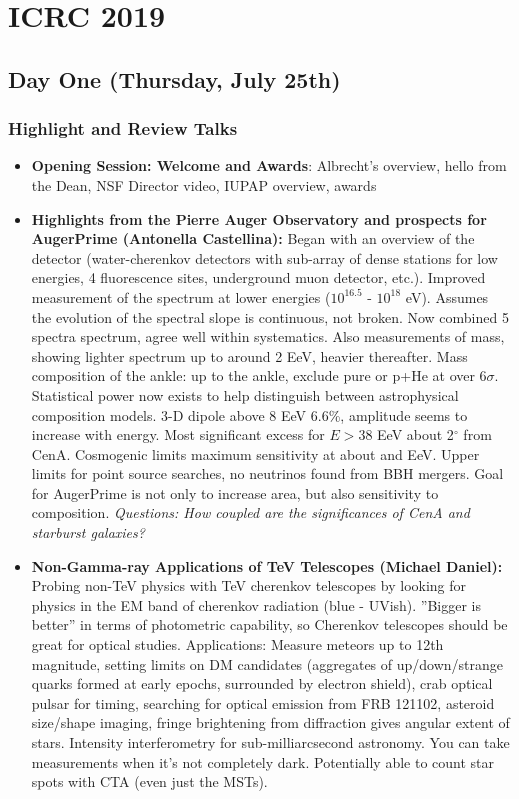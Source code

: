 \chapter{ICRC 2019}

\section{Day One (Thursday, July 25th)}
\subsection{Highlight and Review Talks}
\begin{itemize}
    \item \textbf{Opening Session: Welcome and Awards}: Albrecht's overview, hello from the Dean, NSF Director video, IUPAP overview, awards
    \item \textbf{Highlights from the Pierre Auger Observatory and prospects for AugerPrime (Antonella Castellina):} Began with an overview of the detector (water-cherenkov detectors with sub-array of dense stations for low energies, 4 fluorescence sites, underground muon detector, etc.). Improved measurement of the spectrum at lower energies ($10^{16.5}$ - $10^{18}$ eV). Assumes the evolution of the spectral slope is continuous, not broken. Now combined 5 spectra spectrum, agree well within systematics. Also measurements of mass, showing lighter spectrum up to around 2 EeV, heavier thereafter. Mass composition of the ankle: up to the ankle, exclude pure or p+He at over $6\sigma$. Statistical power now exists to help distinguish between astrophysical composition models. 3-D dipole above 8 EeV 6.6\%, amplitude seems to increase with energy. Most significant excess for $E > 38$ EeV about 2$^{\circ}$ from CenA. Cosmogenic limits maximum sensitivity at about and EeV. Upper limits for point source searches, no neutrinos found from BBH mergers. Goal for AugerPrime is not only to increase area, but also sensitivity to composition. \textit{Questions: How coupled are the significances of CenA and starburst galaxies?}
    \item \textbf{Non-Gamma-ray Applications of TeV Telescopes (Michael Daniel):} Probing non-TeV physics with TeV cherenkov telescopes by looking for physics in the EM band of cherenkov radiation (blue - UVish). ''Bigger is better'' in terms of photometric capability, so Cherenkov telescopes should be great for optical studies. Applications: Measure meteors up to 12th magnitude, setting limits on DM candidates (aggregates of up/down/strange quarks formed at early epochs, surrounded by electron shield), crab optical pulsar for timing, searching for optical emission from FRB 121102, asteroid size/shape imaging, fringe brightening from diffraction gives angular extent of stars. Intensity interferometry for sub-milliarcsecond astronomy. You can take measurements when it's not completely dark. Potentially able to count star spots with CTA (even just the MSTs).

\end{itemize}
